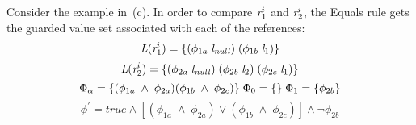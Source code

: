 Consider the example in~(c). In order to compare
$\emph{r}_1^i$ and $\emph{r}_2^i$, the Equals rule gets the 
guarded value set associated with each of the references:
\[
\emph{L}(\emph{r}_1^i) = \{ (\phi_{1a}\; \emph{l}_\mathit{null})\; (\phi_{1b}\; \emph{l}_1) \} 
\]
\[
\emph{L}(\emph{r}_2^i) = \{ (\phi_{2a}\; \emph{l}_\mathit{null})\; (\phi_{2b}\; \emph{l}_2)\; (\phi_{2c}\; \emph{l}_1) \} \\
\]
\[
\Phi_\alpha = \{ (\phi_{1a}\; \wedge\; \phi_{2a} ) (\phi_{1b}\; \wedge\; \phi_{2c} ) \}\;
\Phi_0 = \{ \}\; \Phi_1 = \{ \phi_{2b}\} \\
\]
\[
\phi^\prime = \mathit{true} \wedge [ (\phi_{1a}\; \wedge\; \phi_{2a} )\vee (\phi_{1b}\; \wedge\; \phi_{2c} ) ] \wedge \neg\phi_{2b} 
\]





